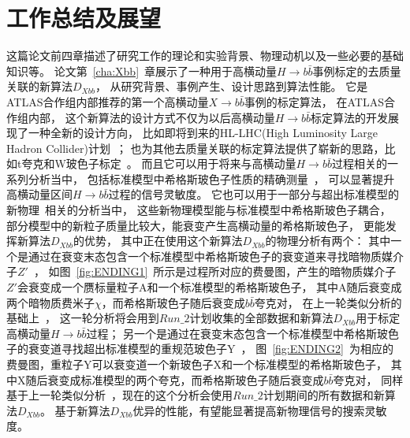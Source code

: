 
\chapter{工作总结及展望}
\label{cha:Summary}

这篇论文前四章描述了研究工作的理论和实验背景、物理动机以及一些必要的基础知识等。
论文第~\ref{cha:Xbb}~章展示了一种用于高横动量$H\rightarrow b\bar{b}$事例标定的去质量关联的新算法$D_{Xbb}$，
从研究背景、事例产生、设计思路到算法性能。
它是ATLAS合作组内部推荐的第一个高横动量$X\rightarrow b\bar{b}$事例的标定算法，
在ATLAS合作组内部，
这个新算法的设计方式不仅为以后高横动量$H\rightarrow b\bar{b}$标定算法的开发展现了一种全新的设计方向，
比如即将到来的HL-LHC(High Luminosity Large Hadron Collider)计划~\cite{HLLHC}；
也为其他去质量关联的标定算法提供了崭新的思路，比如t夸克和W玻色子标定~\cite{ATL-PHYS-PUB-2017-004}。
而且它可以用于将来与高横动量$H\rightarrow b\bar{b}$过程相关的一系列分析当中，
包括标准模型中希格斯玻色子性质的精确测量~\cite{AHbb6,AHbb7,AHbb8,AHbb5}，
可以显著提升高横动量区间$H\rightarrow b\bar{b}$过程的信号灵敏度。
它也可以用于一部分与超出标准模型的新物理~\cite{BSMHIGGS1,BSMHIGGS2,BSMHIGGS3,DXBB6,DXBB7}相关的分析当中，
这些新物理模型能与标准模型中希格斯玻色子耦合，
部分模型中的新粒子质量比较大，能衰变产生高横动量的希格斯玻色子，
更能发挥新算法$D_{Xbb}$的优势，
其中正在使用这个新算法$D_{Xbb}$的物理分析有两个：
其中一个是通过在衰变末态包含一个标准模型中希格斯玻色子的衰变道来寻找暗物质媒介子$Z'$~\cite{DXBB4,DXBB5,DXBB6}，
如图~\ref{fig:ENDING1}~所示是过程所对应的费曼图，产生的暗物质媒介子$Z'$会衰变成一个赝标量粒子A和一个标准模型的希格斯玻色子，
其中A随后衰变成两个暗物质费米子$\chi$，而希格斯玻色子随后衰变成$b\bar{b}$夸克对，
在上一轮类似分析的基础上~\cite{DXBB3}，
这一轮分析将会用到$Run\_2$计划收集的全部数据和新算法$D_{Xbb}$用于标定高横动量$H\rightarrow b\bar{b}$过程；
另一个是通过在衰变末态包含一个标准模型中希格斯玻色子的衰变道寻找超出标准模型的重规范玻色子Y~\cite{DXBB7,DXBB8,DXBB9,DXBB10,DXBB11}，
图~\ref{fig:ENDING2}~为相应的费曼图，重粒子Y可以衰变道一个新玻色子X和一个标准模型的希格斯玻色子，
其中X随后衰变成标准模型的两个夸克，而希格斯玻色子随后衰变成$b\bar{b}$夸克对，
同样基于上一轮类似分析~\cite{DXBB2}，现在的这个分析会使用$Run\_2$计划期间的所有数据和新算法$D_{Xbb}$。
基于新算法$D_{Xbb}$优异的性能，有望能显著提高新物理信号的搜索灵敏度。

